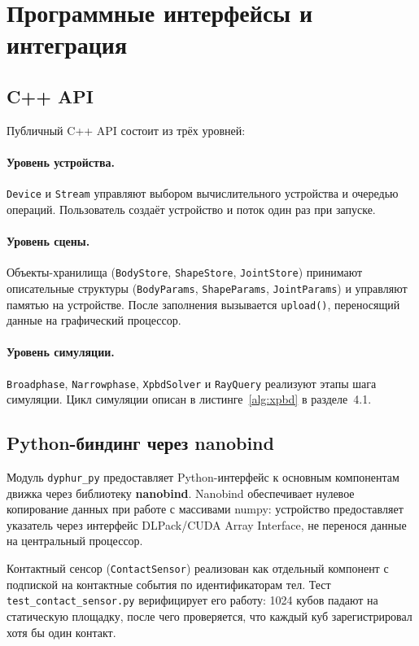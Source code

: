 \section{Программные интерфейсы и интеграция}

\subsection{C++ API}

Публичный C++ API состоит из трёх уровней:

\paragraph{Уровень устройства.}
\texttt{Device} и \texttt{Stream} управляют выбором вычислительного устройства
и очередью операций. Пользователь создаёт устройство и поток один раз при запуске.

\paragraph{Уровень сцены.}
Объекты-хранилища (\texttt{BodyStore}, \texttt{ShapeStore}, \texttt{JointStore})
принимают описательные структуры (\texttt{BodyParams}, \texttt{ShapeParams},
\texttt{JointParams}) и управляют памятью на устройстве.
После заполнения вызывается \texttt{upload()}, переносящий данные на графический процессор.

\paragraph{Уровень симуляции.}
\texttt{Broadphase}, \texttt{Narrowphase}, \texttt{XpbdSolver}
и \texttt{RayQuery} реализуют этапы шага симуляции.
Цикл симуляции описан в листинге~\ref{alg:xpbd} в разделе~4.1.

\subsection{Python-биндинг через nanobind}

Модуль \texttt{dyphur\_py} предоставляет Python-интерфейс к основным компонентам движка через библиотеку 
\textbf{nanobind}. Nanobind обеспечивает нулевое копирование данных при работе с массивами numpy: устройство 
предоставляет указатель через интерфейс DLPack/CUDA Array Interface, не перенося данные на центральный процессор.

Контактный сенсор (\texttt{ContactSensor}) реализован как отдельный компонент с подпиской на контактные 
события по идентификаторам тел. Тест \texttt{test\_contact\_sensor.py} верифицирует его работу: 1024 кубов 
падают на статическую площадку, после чего проверяется, что каждый куб зарегистрировал хотя бы один контакт.

